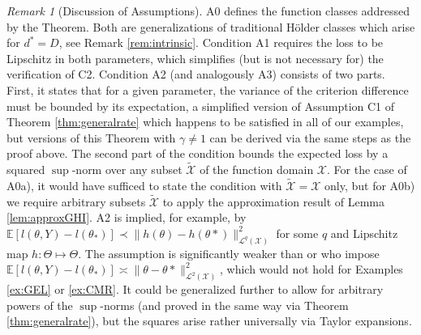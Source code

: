 \documentclass[12pt]{article}
\theoremstyle{myplain}
\theoremstyle{definition}
\theoremstyle{definition}
\theoremstyle{remark}
\newtheorem{remark}{Remark}[section]
\numberwithin{equation}{section}
\begin{document}
\begin{remark}[Discussion of Assumptions] A0 defines the function classes addressed by the Theorem. Both are generalizations of traditional Hölder classes which arise for $d^*=D$, see Remark \ref{rem:intrinsic}. Condition A1 requires the loss to be Lipschitz in both parameters, which simplifies (but is not necessary for) the verification of C2. Condition A2 (and analogously A3) consists of two parts. First, it states that for a given parameter, the variance of the criterion difference must be bounded by its expectation, a simplified version of Assumption C1 of Theorem \ref{thm:generalrate} which happens to be satisfied in all of our examples, but versions of this Theorem with $\gamma\neq 1$ can be derived via the same steps as the proof above. The second part of the condition bounds the expected loss by a squared $\sup$-norm over any subset $\widetilde{\mathcal{X}}$ of the function domain $\mathcal{X}$. For the case of A0a), it would have sufficed to state the condition with $\widetilde{\mathcal{X}}=\mathcal{X}$ only, but for A0b) we require arbitrary subsets $\widetilde{\mathcal{X}}$ to apply the approximation result of Lemma \ref{lem:approxGHI}. A2 is implied, for example, by $\mathbb{E}[l(\theta, Y)-l(\theta_*)]\prec \|h(\theta)-h(\theta*)\|^2_{\mathcal{L}^q(\mathcal{X})}$ for some $q$ and Lipschitz map $h: \Theta\mapsto\Theta$. The assumption is significantly weaker than \cite{shen2019asymptotic} or \cite{farrell2018deep} who impose $\mathbb{E}[l(\theta, Y)-l(\theta_*)]\asymp \|\theta-\theta*\|^2_{\mathcal{L}^2(\mathcal{X})}$, which would not hold for Examples \ref{ex:GEL} or \ref{ex:CMR}. It could be generalized further to allow for arbitrary powers of the $\sup$-norms (and proved in the same way via Theorem \ref{thm:generalrate}), but the squares arise rather universally via Taylor expansions.
\end{remark}
\end{document}
